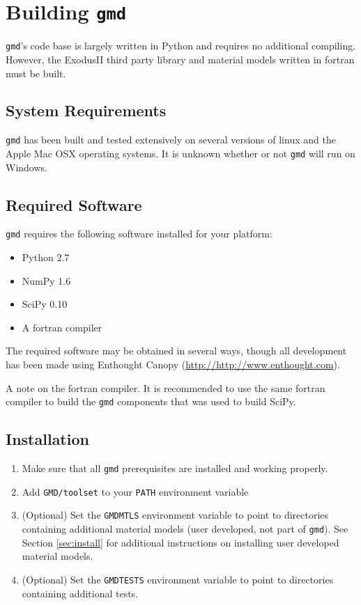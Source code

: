 \documentclass[11pt]{report}
\newcommand{\gmd}{\texttt{gmd}}
\begin{document}
\chapter{Building \gmd}
\gmd's code base is largely written in Python and requires no additional
compiling.  However, the ExodusII third party library and material models
written in fortran must be built.

\section{System Requirements}
\gmd{} has been built and tested extensively on several versions of linux and
the Apple Mac OSX operating systems. It is unknown whether or not \gmd{}
will run on Windows.


\section{Required Software}
\gmd{} requires the following software installed for your platform:

\begin{itemize}
  \item Python 2.7
  \item NumPy 1.6
  \item SciPy 0.10
  \item A fortran compiler
\end{itemize}

The required software may be obtained in several ways, though all development
has been made using Enthought Canopy (\url{http://http://www.enthought.com}).

A note on the fortran compiler.  It is recommended to use the same fortran
compiler to build the \gmd{} components that was used to build SciPy.

\section{Installation}
\begin{enumerate}
  \item Make sure that all \gmd{} prerequisites are installed and working properly.
  \item Add \verb:GMD/toolset: to your \texttt{PATH} environment variable
  \item (Optional) Set the \texttt{GMDMTLS} environment variable to point to
  directories containing additional material models (user developed, not part
  of \gmd{}). See Section \ref{sec:install} for additional instructions on
  installing user developed material models.
  \item (Optional) Set the \texttt{GMDTESTS} environment variable to point to
  directories containing additional tests.
\end{enumerate}
\end{document}
